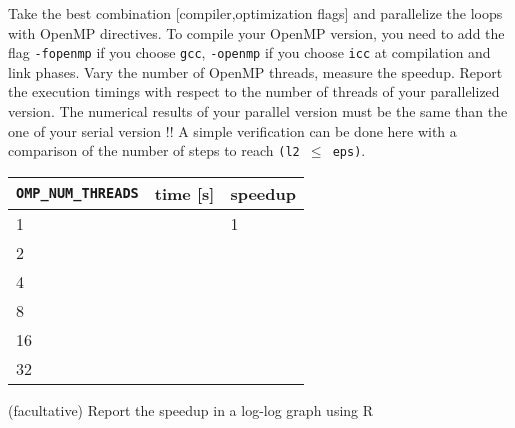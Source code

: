 \documentclass[11pt,a4paper]{article}
\begin{document}
\begin{exercise}
Take the best combination [compiler,optimization flags] and parallelize the loops with OpenMP directives. To compile your OpenMP version, you need to add the flag {\tt -fopenmp} if you choose {\tt gcc}, {\tt -openmp} if you choose {\tt icc} at compilation and link phases. Vary the number of OpenMP threads, measure the speedup. Report the execution timings with respect to the number of threads of your parallelized version. The numerical results of your parallel version must be the same than the one of your serial version !! A simple verification can be done here with a comparison of the number of steps to reach {\tt (l2 $\leq$ eps)}.

\begin{center}
   \begin{tabular}{|l|l|l|}
     \hline
     {\tt OMP\_NUM\_THREADS} & time [s] & speedup \\ \hline \hline
      1 & & 1 \\ \hline
      2 & &  \\ \hline
      4 & &  \\ \hline
      8 & &  \\ \hline
      16 & &  \\ \hline
      32 & &  \\ \hline
     \hline
   \end{tabular}
 \end{center}
(facultative) Report the speedup in a log-log graph using R
\end{exercise}
\end{document}

